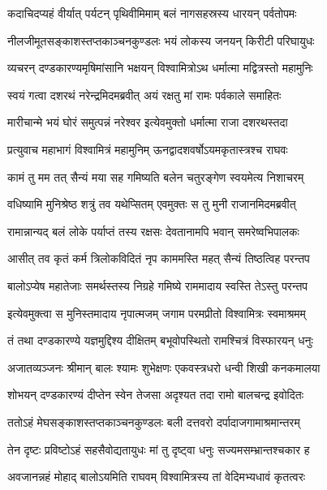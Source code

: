 
\twolineshloka
{कदाचिदप्यहं वीर्यात् पर्यटन् पृथिवीमिमाम्}
{बलं नागसहस्रस्य धारयन् पर्वतोपमः} %

\twolineshloka
{नीलजीमूतसङ्काशस्तप्तकाञ्चनकुण्डलः}
{भयं लोकस्य जनयन् किरीटी परिघायुधः} %

\twolineshloka
{व्यचरन् दण्डकारण्यमृषिमांसानि भक्षयन्}
{विश्वामित्रोऽथ धर्मात्मा मद्वित्रस्तो महामुनिः} %

\twolineshloka
{स्वयं गत्वा दशरथं नरेन्द्रमिदमब्रवीत्}
{अयं रक्षतु मां रामः पर्वकाले समाहितः} %

\twolineshloka
{मारीचान्मे भयं घोरं समुत्पन्नं नरेश्वर}
{इत्येवमुक्तो धर्मात्मा राजा दशरथस्तदा} %

\twolineshloka
{प्रत्युवाच महाभागं विश्वामित्रं महामुनिम्}
{ऊनद्वादशवर्षोऽयमकृतास्त्रश्च राघवः} %

\twolineshloka
{कामं तु मम तत् सैन्यं मया सह गमिष्यति}
{बलेन चतुरङ्गेण स्वयमेत्य निशाचरम्} %

\twolineshloka
{वधिष्यामि मुनिश्रेष्ठ शत्रुं तव यथेप्सितम्}
{एवमुक्तः स तु मुनी राजानमिदमब्रवीत्} %

\twolineshloka
{रामान्नान्यद् बलं लोके पर्याप्तं तस्य रक्षसः}
{देवतानामपि भवान् समरेष्वभिपालकः} %

\twolineshloka
{आसीत् तव कृतं कर्म त्रिलोकविदितं नृप}
{काममस्ति महत् सैन्यं तिष्ठत्विह परन्तप} %

\twolineshloka
{बालोऽप्येष महातेजाः समर्थस्तस्य निग्रहे}
{गमिष्ये राममादाय स्वस्ति तेऽस्तु परन्तप} %

\twolineshloka
{इत्येवमुक्त्वा स मुनिस्तमादाय नृपात्मजम्}
{जगाम परमप्रीतो विश्वामित्रः स्वमाश्रमम्} %

\twolineshloka
{तं तथा दण्डकारण्ये यज्ञमुद्दिश्य दीक्षितम्}
{बभूवोपस्थितो रामश्चित्रं विस्फारयन् धनुः} %

\twolineshloka
{अजातव्यञ्जनः श्रीमान् बालः श्यामः शुभेक्षणः}
{एकवस्त्रधरो धन्वी शिखी कनकमालया} %

\twolineshloka
{शोभयन् दण्डकारण्यं दीप्तेन स्वेन तेजसा}
{अदृश्यत तदा रामो बालचन्द्र इवोदितः} %

\twolineshloka
{ततोऽहं मेघसङ्काशस्तप्तकाञ्चनकुण्डलः}
{बली दत्तवरो दर्पादाजगामाश्रमान्तरम्} %

\twolineshloka
{तेन दृष्टः प्रविष्टोऽहं सहसैवोद्यतायुधः}
{मां तु दृष्ट्वा धनुः सज्यमसम्भ्रान्तश्चकार ह} %

\twolineshloka
{अवजानन्नहं मोहाद् बालोऽयमिति राघवम्}
{विश्वामित्रस्य तां वेदिमभ्यधावं कृतत्वरः} %

